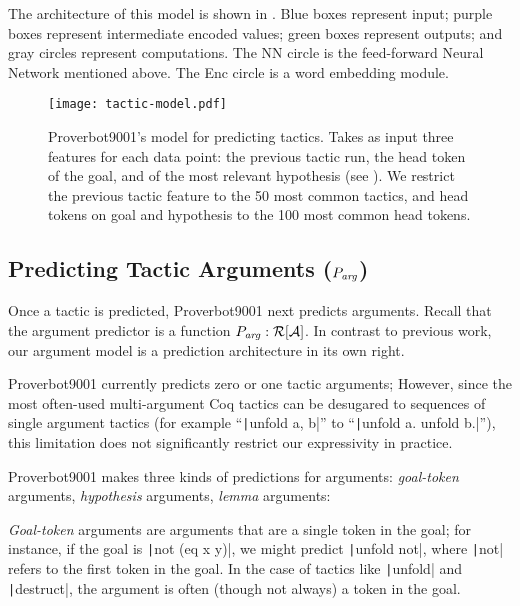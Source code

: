 \documentclass[sigplan,screen]{acmart}
\newcommand{\name}{Proverbot9001\xspace}
\newcommand{\coqinline}[1]{\texttt|#1|}
\newcommand{\Args}{\mathcal{A}}
\newcommand{\PArg}{P_{\it arg}}
\newcommand{\Predictors}{\mathcal{R}}
\renewcommand{\>}{\quad}
\begin{document}
The architecture of this model is shown in .
Blue boxes represent input;
  purple boxes represent intermediate encoded values;
  green boxes represent outputs;
  and gray circles represent computations.
The NN circle is the feed-forward Neural Network mentioned above.
The Enc circle is a word embedding module.

\begin{figure}
\texttt{[image: tactic-model.pdf]}
\caption{\name{}'s model for predicting tactics. Takes as input three
  features for each data point: the previous tactic run, the head
  token of the goal, and of the most relevant hypothesis (see
  ). We restrict the previous tactic feature to the 50
  most common tactics, and head tokens on goal and hypothesis to the
  100 most common head tokens.}
\label{fig:tactic-model}
\end{figure}







\subsection{Predicting Tactic Arguments ($\PArg$)}
\label{ssec:arguments}

Once a tactic is predicted, \name{} next predicts arguments.
Recall that the argument predictor is a function $\PArg: \Predictors[\Args]$.
In contrast to previous work, our argument model is a prediction architecture in its own right.

\name{} currently predicts zero or one tactic arguments;
However, since the most often-used multi-argument Coq tactics can be desugared to sequences of single argument tactics (for example ``\coqinline{unfold a, b}'' to ``\coqinline{unfold  a. unfold b.}''), this limitation does not significantly restrict our expressivity in practice.

\name{} makes three kinds of predictions for arguments:
  \emph{goal-token} arguments, \emph{hypothesis} arguments,
  \emph{lemma} arguments:


\emph{Goal-token} arguments are arguments that are a single token in the goal;
  for instance, if the goal is \coqinline{not (eq x y)},
  we might predict \coqinline{unfold not},
  where \coqinline{not} refers to the first token in the goal.
In the case of tactics like \coqinline{unfold} and \coqinline{destruct},
  the argument is often (though not always) a token in the goal.
\end{document}

